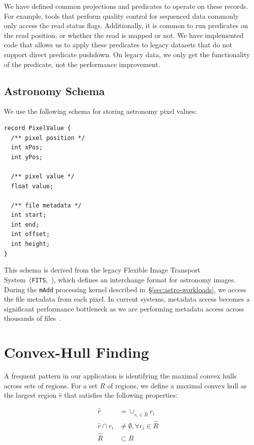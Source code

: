 \documentclass{sig-alternate}
\begin{document}
We have defined common projections and predicates to operate on these records. For
example, tools that perform quality control for sequenced data commonly only access the read status flags.
Additionally, it is common to run predicates on the read position,
or whether the read is mapped or not. We have implemented code that allows us to apply these predicates to legacy
datasets that do not support
direct predicate pushdown. On legacy data, we only get the functionality of the predicate, not the
performance improvement.

\subsection{Astronomy Schema}
\label{sec:astronomy-schema}

We use the following schema for storing astronomy pixel values:

\begin{lstlisting}
record PixelValue {
  /** pixel position */
  int xPos;
  int yPos;
  
  /** pixel value */
  float value;
  
  /** file metadata */
  int start;
  int end;
  int offset;
  int height;
}
\end{lstlisting}

This schema is derived from the legacy Flexible Image Transport System~(\texttt{FITS},~\cite{wells81}), which
defines an interchange format for astronomy images. During the \texttt{mAdd} processing kernel
described in~\S\ref{sec:astro-workloads}, we access the file metadata from each pixel. In current systems,
metadata access becomes a significant performance bottleneck as we are performing metadata access
across thousands of files~\cite{zhang13}.

\section{Convex-Hull Finding}
\label{sec:convex-hull}

A frequent pattern in our application is identifying the maximal convex hulls across sets of regions. For
a set $R$ of regions, we define a maximal convex hull as the largest region $\hat{r}$ that satisfies the
following properties:

\begin{align}
\label{eqn:convexity-constraint}
\hat{r} &= \cup_{r_i \in \hat{R}} r_i \\
\hat{r} \cap r_i &\ne \emptyset, \forall r_i \in \hat{R} \\
\hat{R} &\subset R
\end{align}
\end{document}

